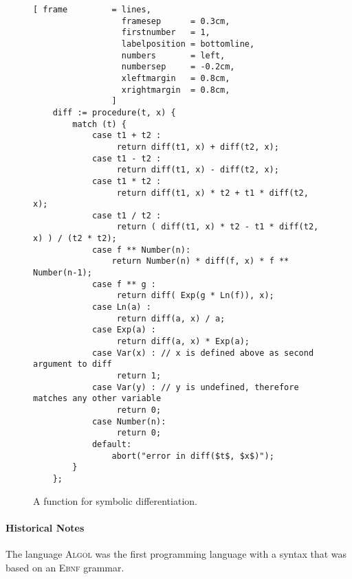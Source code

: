 \begin{figure}[!ht]
\centering
\begin{Verbatim}[ frame         = lines, 
                  framesep      = 0.3cm, 
                  firstnumber   = 1,
                  labelposition = bottomline,
                  numbers       = left,
                  numbersep     = -0.2cm,
                  xleftmargin   = 0.8cm,
                  xrightmargin  = 0.8cm,
                ]
    diff := procedure(t, x) {
        match (t) {
            case t1 + t2 :
                 return diff(t1, x) + diff(t2, x);
            case t1 - t2 :
                 return diff(t1, x) - diff(t2, x);
            case t1 * t2 :
                 return diff(t1, x) * t2 + t1 * diff(t2, x);
            case t1 / t2 :
                 return ( diff(t1, x) * t2 - t1 * diff(t2, x) ) / (t2 * t2);
            case f ** Number(n): 
                return Number(n) * diff(f, x) * f ** Number(n-1);
            case f ** g :
                 return diff( Exp(g * Ln(f)), x);
            case Ln(a) :
                 return diff(a, x) / a;
            case Exp(a) : 
                 return diff(a, x) * Exp(a);
            case Var(x) : // x is defined above as second argument to diff
                 return 1;
            case Var(y) : // y is undefined, therefore matches any other variable
                 return 0;
            case Number(n):
                 return 0;    
            default:
                abort("error in diff($t$, $x$)");
        }
    };
\end{Verbatim}
\vspace*{-0.3cm}
\caption{A function for symbolic differentiation.}
\label{fig:diff.stlx}
\end{figure}


\paragraph{Historical Notes} The language \textsc{Algol} \cite{backus:1959,naur:1960} was the first
programming language with a syntax that was based on an \textsc{Ebnf} grammar.  

